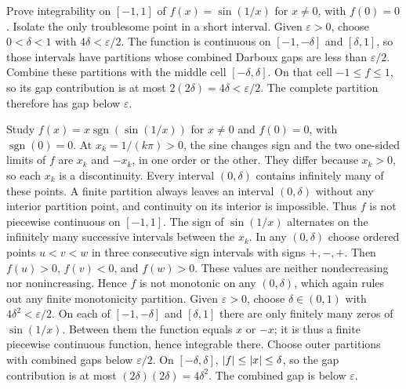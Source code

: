 \goal Prove integrability on $[-1,1]$ of $f(x)=\sin(1/x)$ for $x\ne0$,
with $f(0)=0$.
\idea Isolate the only troublesome point in a short interval.
Given $\varepsilon>0$, choose $0<\delta<1$ with $4\delta<\varepsilon/2$.
The function is continuous on $[-1,-\delta]$ and $[\delta,1]$,
so those intervals have partitions whose combined Darboux gaps are
less than $\varepsilon/2$. Combine these partitions with the middle
cell $[-\delta,\delta]$.
On that cell $-1\le f\le1$, so its gap contribution is at most
$2(2\delta)=4\delta<\varepsilon/2$.
The complete partition therefore has gap below $\varepsilon$.

\goal Study $f(x)=x\operatorname{sgn}(\sin(1/x))$ for $x\ne0$ and
$f(0)=0$, with $\operatorname{sgn}(0)=0$.
At $x_k=1/(k\pi)>0$, the sine changes sign and the two one-sided
limits of $f$ are $x_k$ and $-x_k$, in one order or the other.
They differ because $x_k>0$, so each $x_k$ is a discontinuity.
Every interval $(0,\delta)$ contains infinitely many of these points.
A finite partition always leaves an interval $(0,\delta)$ without any
interior partition point, and continuity on its interior is impossible.
Thus $f$ is not piecewise continuous on $[-1,1]$.
The sign of $\sin(1/x)$ alternates on the infinitely many successive
intervals between the $x_k$. In any $(0,\delta)$ choose ordered points
$u<v<w$ in three consecutive sign intervals with signs $+,-,+$.
Then $f(u)>0$, $f(v)<0$, and $f(w)>0$. These values are neither
nondecreasing nor nonincreasing. Hence $f$ is not monotonic on any
$(0,\delta)$, which again rules out any finite monotonicity partition.
Given $\varepsilon>0$, choose $\delta\in(0,1)$ with
$4\delta^2<\varepsilon/2$. On each of $[-1,-\delta]$ and
$[\delta,1]$ there are only finitely many zeros of $\sin(1/x)$.
Between them the function equals $x$ or $-x$; it is thus a finite
piecewise continuous function, hence integrable there. Choose outer
partitions with combined gaps below $\varepsilon/2$.
On $[-\delta,\delta]$, $\left|f\right|\le\left|x\right|\le\delta$, so the gap
contribution is at most $(2\delta)(2\delta)=4\delta^2$.
The combined gap is below $\varepsilon$.

